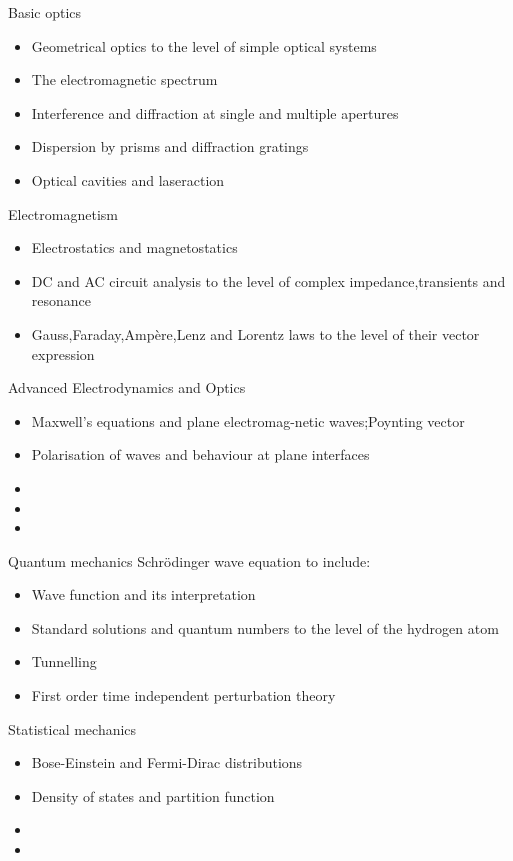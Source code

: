 \documentclass[a4paper, oneside, 12pt]{memoir}
\begin{document}
Basic optics
\begin{itemize}
    \item Geometrical optics to the level of simple optical systems
    \item The electromagnetic spectrum
    \item Interference and diffraction at single and multiple apertures
    \item Dispersion by prisms and diffraction gratings
    \item Optical cavities and laseraction
    
\end{itemize}
Electromagnetism
\begin{itemize}
    \item Electrostatics and magnetostatics
    \item DC and AC circuit analysis to the level of complex impedance,transients and resonance
     \item Gauss,Faraday,Ampère,Lenz and Lorentz laws to the level of their vector expression

\end{itemize}
Advanced Electrodynamics and Optics
\begin{itemize}
    \item Maxwell’s equations and plane electromag-netic waves;Poynting vector
    \item Polarisation of waves and behaviour at plane interfaces
    \item 
    \item 
    \item 
\end{itemize}
Quantum mechanics
Schrödinger wave equation to include:
\begin{itemize}
    \item Wave function and its interpretation
    \item Standard solutions and quantum numbers to the level of the hydrogen atom
    \item Tunnelling
    \item First order time independent perturbation theory
\end{itemize}
Statistical mechanics
\begin{itemize}
    \item Bose-Einstein and Fermi-Dirac distributions
    \item Density of states and partition function
    \item 
    \item 
\end{itemize}
\end{document}
